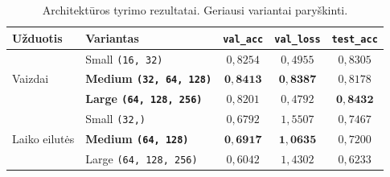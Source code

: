 \begin{table}[H]
    \centering
    \caption{Architektūros tyrimo rezultatai. Geriausi variantai paryškinti.}
    \begin{tabular}{|l|l|c|c|c|}
        \hline
        Užduotis & Variantas & \texttt{val\_acc} & \texttt{val\_loss} & \texttt{test\_acc} \\
        \hline
        \multirow{3}{*}{Vaizdai}
            & Small \texttt{(16, 32)}        & $0{,}8254$ & $0{,}4955$ & $0{,}8305$ \\ \cline{2-5}
            & \textbf{Medium \texttt{(32, 64, 128)}} & $\mathbf{0{,}8413}$ & $\mathbf{0{,}8387}$ & $0{,}8178$ \\ \cline{2-5}
            & \textbf{Large \texttt{(64, 128, 256)}} & $0{,}8201$ & $0{,}4792$ & $\mathbf{0{,}8432}$ \\
        \hline
        \multirow{3}{*}{Laiko eilutės}
            & Small \texttt{(32,)}           & $0{,}6792$ & $1{,}5507$ & $0{,}7467$ \\ \cline{2-5}
            & \textbf{Medium \texttt{(64, 128)}} & $\mathbf{0{,}6917}$ & $\mathbf{1{,}0635}$ & $0{,}7200$ \\ \cline{2-5}
            & Large \texttt{(64, 128, 256)}  & $0{,}6042$ & $1{,}4302$ & $0{,}6233$ \\
        \hline
    \end{tabular}
    \label{tab:rez_architektura}
\end{table}

